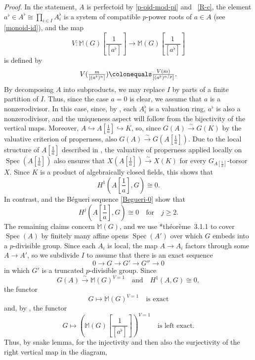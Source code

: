 \documentclass[11pt, reqno]{amsart}
\newcommand{\bM}{\mathbb{M}}
\DeclareMathOperator{\Spec}{Spec}		%
\newcommand{\ce}{\colonequals}
\newcommand{\hra}{\hookrightarrow}
\newcommand{\isomto}{\overset{\sim}{\longrightarrow}}
\newcommand{\ra}{\rightarrow}
\providecommand{\f}[2]{\frac{#1}{#2}}
\providecommand{\qxq}[1]{\quad\text{#1}\quad}
\providecommand{\qx}[1]{\quad\text{#1}}
\newcommand{\tst}{\textstyle}
\numberwithin{equation}{numberingbase}
\theoremstyle{thms}
\theoremstyle{claims}
\theoremstyle{defs}
\theoremstyle{thms}
\theoremstyle{defs}
\theoremstyle{subsection-tweak}
\theoremstyle{subsection-tweak}
\begin{document}
\emph{Proof.}
In the statement, $A$ is perfectoid by \eqref{p-oid-mod-pi} and ~\ref{R-c}, the element $a^\flat \in A^\flat \cong \prod_{i \in I} A_i^\flat$ is a system of compatible $p$-power roots of $a \in A$ (see \eqref{monoid-id}), and the map  
\[
\tst V \colon \bM(G)[\f 1{[a^\flat]}] \ra \bM(G)[\f 1{[a^\flat]}]
\]
is defined by 
\[
\tst V(\f{m}{[(a^\flat)^n]}) \ce \f{V(m)}{[(a^\flat)^{n/p}]}.
\]
By decomposing $A$ into subproducts, we may replace $I$ by parts of a finite partition of $I$. Thus, since the case $a = 0$ is clear, we assume that $a$ is a nonzerodivisor. In this case, since, by , each $A_i^\flat$ is a valuation ring, $a^\flat$ is also a nonzerodivisor, and the uniqueness aspect %
will follow from the bijectivity of the vertical maps. Moreover, $A \hra A[\f 1a] \hra K$, so, since $G(A) \isomto G(K)$ by the valuative criterion of properness, %
also $G(A) \isomto G(A[\f 1a])$.
Due to the local structure of $A[\f 1a]$ described in , the valuative of properness applied locally on $\Spec(A[\f{1}{a}])$ also ensures that $X(A[\f 1a]) \isomto X(K)$
for every $G_{A[\f{1}{a}]}$-torsor $X$. Since $K$ is a product of algebraically closed fields, %
this shows that %
\[
\tst H^1(A[\f 1a], G) \cong 0.
\]
In contrast,  and the B\'{e}gueri sequence \eqref{Begueri-0} show that 
\[
\tst H^j(A[\f 1a], G) \cong 0 \qxq{for} j \ge 2.
\]
The remaining claims concern $\bM(G)$, and we use \cite{BBM82}*{th\'{e}or\`{e}me~3.1.1} to cover $\Spec(A)$ by finitely many affine opens $\Spec(A')$ over which $G$ embeds into a $p$-divisible group. Since each $A_i$ is local, the map $A \ra A_i$ factors through some $A \ra A'$, so we subdivide $I$ to assume that there is an exact sequence 
\begin{equation*} \label{}
0 \ra G \ra G' \ra G'' \ra 0
\end{equation*}
in which $G'$ is a truncated $p$-divisible group. Since 
\[
G(A) \isomto \bM(G)^{V = 1} \qxq{and} H^1(A, G) \cong 0,
\]
the functor 
\[
\tst G \mapsto \bM(G)^{V = 1} \qx{is exact}
\]
and, by , the functor 
\[
\tst G \mapsto (\bM(G)[\f 1{[a^\flat]}])^{V = 1} \qx{is left exact.}
\]
 Thus, by snake lemma, for the injectivity and then also the surjectivity of the right vertical map in the diagram, %
\end{document}
